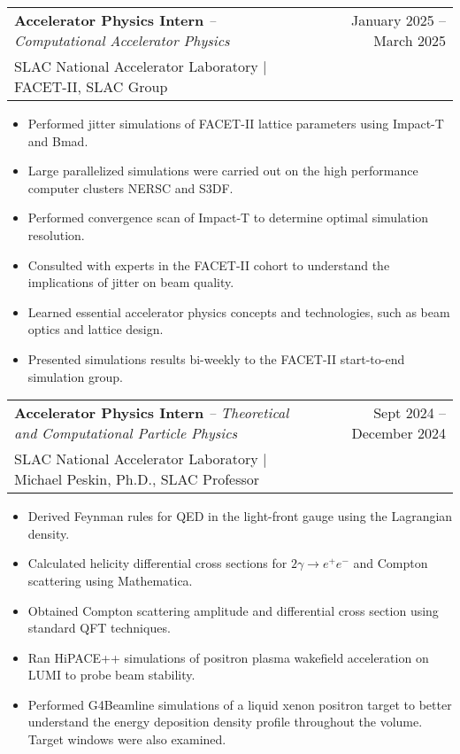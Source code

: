 \documentclass[a4paper,11pt]{article}
\makeatletter
\newenvironment{jobcustomlong}[4]
    {
    \begin{tabularx}{\linewidth}{@{}l X r@{}}
    \textbf{#1} \textit{#2} & \hfill &  #3 \\[-2.5pt]
    \textcolor{black!55!white}{\small #4} \\[2.5pt]
    \end{tabularx}
    \begin{minipage}[t]{\linewidth}
    \begin{itemize}[nosep,after=\strut, leftmargin=1.75em, itemsep=1pt,label={\small$\bullet$}]
    }
    {
    \end{itemize} \vspace{.325em}
    \end{minipage}   
    }
\makeatother
\begin{document}
\begin{jobcustomlong}{Accelerator Physics Intern}{-- Computational Accelerator Physics}{January 2025 -- March 2025}{{SLAC} National Accelerator Laboratory $\vert$ FACET-II, SLAC Group}
    \item Performed jitter simulations of FACET-II lattice parameters using Impact-T and Bmad.
    \item Large parallelized simulations were carried out on the high performance computer clusters NERSC and S3DF.
    \item Performed convergence scan of Impact-T to determine optimal simulation resolution.
    \item Consulted with experts in the FACET-II cohort to understand the implications of jitter on beam quality.
    \item Learned essential accelerator physics concepts and technologies, such as beam optics and lattice design.
    \item Presented simulations results bi-weekly to the FACET-II start-to-end simulation group.
\end{jobcustomlong}
\begin{jobcustomlong}{Accelerator Physics Intern}{-- Theoretical and Computational Particle Physics}{Sept 2024 -- December 2024}{{SLAC} National Accelerator Laboratory $\vert$ Michael Peskin, Ph.D., SLAC Professor}
    \item Derived Feynman rules for QED in the light-front gauge using the Lagrangian density.
    \item Calculated helicity differential cross sections for $2\gamma\to e^+e^-$ and Compton scattering using Mathematica.
    \item Obtained Compton scattering amplitude and differential cross section using standard QFT techniques.
    \item Ran HiPACE++ simulations of positron plasma wakefield acceleration on {LUMI} to probe beam stability.
    \item Performed G4Beamline simulations of a liquid xenon positron target to better understand the energy deposition density profile throughout the volume. Target windows were also examined.
\end{jobcustomlong}
\end{document}
